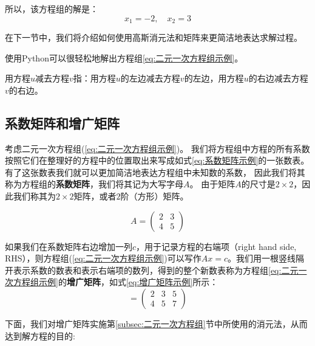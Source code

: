 所以，该方程组的解是：
\[
x_1 = -2, \quad x_2 = 3
\]


在下一节中，我们将介绍如何使用高斯消元法和矩阵来更简洁地表达求解过程。

\vspace{0.3cm}

\noindent 使用Python可以很轻松地解出方程组\ref{eq:二元一次方程组示例}。



\begin{note}
    用方程$u$减去方程$v$指：用方程$u$的左边减去方程$v$的左边，用方程$u$的右边减去方程$v$的右边。
\end{note}

\subsection{系数矩阵和增广矩阵}
\label{subsec:系数矩阵和增广矩阵}

考虑二元一次方程组(\ref{eq:二元一次方程组示例})。
我们将方程组中方程的所有系数按照它们在整理好的方程中的位置取出来写成如式\ref{eq:系数矩阵示例}的一张数表。
有了这张数表我们就可以更加简洁地表达方程组中未知数的系数，
因此我们将其称为方程组的\textcolor{third}{\bf 系数矩阵}，我们将其记为大写字母$A$。
由于矩阵$A$的尺寸是$2\times 2$，因此我们称其为$2\times 2$矩阵，或者$2$阶（方形）矩阵。

\begin{equation}
  A = \left(\begin{array}{ll}
2 & 3 \\
4 & 5
\end{array}\right)
\label{eq:系数矩阵示例}
\end{equation}

如果我们在系数矩阵右边增加一列$c$，用于记录方程的右端项（right hand side, RHS），则方程组(\ref{eq:二元一次方程组示例})可以写作$Ax=c$。我们用一根竖线隔开表示系数的数表和表示右端项的数列，得到的整个新数表称为方程组\ref{eq:二元一次方程组示例}的\textcolor{third}{\bf 增广矩阵}，如式\ref{eq:增广矩阵示例}所示：
\begin{equation}
    [A \mid c]=\left(\begin{array}{cc|c}
2 & 3 & 5 \\
4 & 5 & 7
\end{array}\right)
\label{eq:增广矩阵示例}
\end{equation}

下面，我们对增广矩阵实施第\ref{subsec:二元一次方程组}节中所使用的消元法，从而达到解方程的目的:

